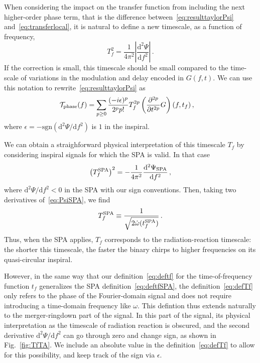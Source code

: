 \documentclass[aps,showpacs,twocolumn,
prd,superscriptaddress,nofootinbib]{revtex4-1}
\newcommand{\be}{\begin{equation}}
\newcommand{\ee}{\end{equation}}
\newcommand\ud{{\mathrm{d}}}
\newcommand\calT{{\mathcal{T}}}
\newcommand{\tf}{t_{f}}
\newcommand{\Tf}{T_{f}}
\newcommand{\tfSPA}{t_{f}^{\rm SPA}}
\newcommand{\jgb}[1]{{\color{DarkGreen} #1}}
\begin{document}
\jgb{When considering the impact on the transfer function from including the next higher-order phase term, that is the difference between~\eqref{eq:resulttaylorPsi} and~\eqref{eq:transferlocal}, it is natural to define a new timescale, as a function of frequency,
\be\label{eq:defTf}
	\Tf^{2} = \frac{1}{4\pi^{2}}\left| \frac{\ud^{2}\Psi}{\ud f^{2}} \right| \,.
\ee
If the correction is small, this timescale should be small compared to the time-scale of variations in the modulation and delay encoded in $G(f,t)$.}
We can use this notation to rewrite~\eqref{eq:resulttaylorPsi} as
\begin{align}\label{eq:resultdffPsiTf}
	 \calT_{\rm phase}(f) &= \sum\limits_{p\geq 0} \frac{(-i\epsilon)^{p}}{2^{p}p!} \Tf^{2p} \left( \frac{\partial^{2p} }{\partial t^{2p}} G \right)(f, \tf) \,,
\end{align}
where $\epsilon = -\mathrm{sgn}(\ud^{2}\Psi/\ud f^{2} )$ is $1$ in the inspiral.

We can obtain a straighforward physical interpretation of this timescale $\Tf$ by considering inspiral signals for which the SPA is valid.
\jgb{In that case
\be
	\left(\Tf^{\rm SPA} \right)^{2} = -\frac{1}{4\pi^{2}}  \frac{\ud^{2} \Psi_{\rm SPA}}{\ud f^{2}} \,,
\ee
where $\ud^{2}\Psi/\ud f^{2} < 0$ in the SPA with our sign conventions.
Then, taking two derivatives of~\eqref{eq:PsiSPA}, we find
\be\label{eq:TfSPA}
	\Tf^{\rm SPA} \equiv \frac{1}{\sqrt{2\dot{\omega}(\tfSPA)}} \,.
\ee
Thus, when the SPA applies, $\Tf$ corresponds to} the radiation-reaction timescale: the shorter this timescale, the faster the binary chirps to higher frequencies on its quasi-circular inspiral. 

However, in the same way that our definition~\eqref{eq:deftf} for the time-of-frequency function $t_{f}$ generalizes the SPA definition~\eqref{eq:deftfSPA}, the definition~\eqref{eq:defTf} only refers to the phase of the Fourier-domain signal and does not require introducing a time-domain frequency like $\omega$. This defintion thus extends naturally to the merger-ringdown part of the signal. In this part of the signal, its physical interpretation as the timescale of radiation reaction is obscured, and the second derivative $\ud^{2}\Psi/\ud f^{2}$ can go through zero and change sign, as shown in Fig.~\ref{fig:TfTA}. We include an absolute value in the definition~\eqref{eq:defTf} to allow for this possibility, and keep track of the sign via $\epsilon$.
\end{document}
